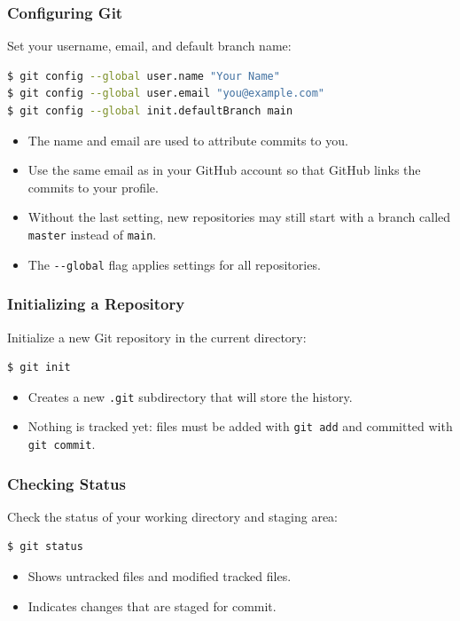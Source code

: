 \begin{frame}[fragile]
	\frametitle{Configuring Git}
	Set your username, email, and default branch name:
\begin{lstlisting}[language=bash]
$ git config --global user.name "Your Name"
$ git config --global user.email "you@example.com"
$ git config --global init.defaultBranch main
\end{lstlisting}
	\begin{itemize}
		\item The name and email are used to attribute commits to you.
		\item Use the same email as in your GitHub account so that GitHub links the commits to your profile.
		\item Without the last setting, new repositories may still start with a branch called \texttt{master} instead of \texttt{main}.
		\item The \texttt{-{}-global} flag applies settings for all repositories.
	\end{itemize}
\end{frame}


\begin{frame}[fragile]
	\frametitle{Initializing a Repository}
	Initialize a new Git repository in the current directory:
\begin{lstlisting}[language=bash]
$ git init
\end{lstlisting}
	\begin{itemize}
		\item Creates a new \texttt{.git} subdirectory that will store the history.
		\item Nothing is tracked yet: files must be added with \texttt{git add} and committed with \texttt{git commit}.
	\end{itemize}
\end{frame}

\begin{frame}[fragile]
	\frametitle{Checking Status}
	Check the status of your working directory and staging area:
\begin{lstlisting}[language=bash]
$ git status
\end{lstlisting}
	\begin{itemize}
		\item Shows untracked files and modified tracked files.
		\item Indicates changes that are staged for commit.
	\end{itemize}
\end{frame}

